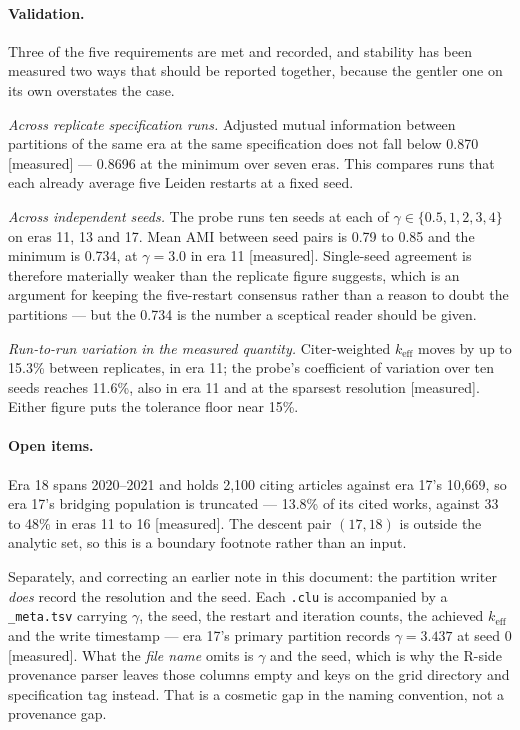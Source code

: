 \documentclass[11pt]{article}
\newcommand{\meas}{{\footnotesize\textsf{[measured]}}}
\newcommand{\code}[1]{\texttt{\small #1}}
\begin{document}
\paragraph{Validation.} Three of the five requirements are met and recorded, and stability has
been measured two ways that should be reported together, because the gentler one on its own
overstates the case.

\emph{Across replicate specification runs.} Adjusted mutual information between partitions of
the same era at the same specification does not fall below 0.870 \meas{} --- 0.8696 at the
minimum over seven eras. This compares runs that each already average five Leiden restarts at
a fixed seed.

\emph{Across independent seeds.} The probe runs ten seeds at each of
$\gamma \in \{0.5, 1, 2, 3, 4\}$ on eras 11, 13 and 17. Mean AMI between seed pairs is 0.79
to 0.85 and the minimum is 0.734, at $\gamma = 3.0$ in era 11 \meas{}. Single-seed agreement
is therefore materially weaker than the replicate figure suggests, which is an argument for
keeping the five-restart consensus rather than a reason to doubt the partitions --- but the
0.734 is the number a sceptical reader should be given.

\emph{Run-to-run variation in the measured quantity.} Citer-weighted $k_{\mathrm{eff}}$ moves
by up to 15.3\% between replicates, in era 11; the probe's coefficient of variation over ten
seeds reaches 11.6\%, also in era 11 and at the sparsest resolution \meas{}. Either figure
puts the tolerance floor near 15\%.

\paragraph{Open items.} Era 18 spans 2020--2021 and holds 2{,}100 citing articles against era
17's 10{,}669, so era 17's bridging population is truncated --- 13.8\% of its cited works,
against 33 to 48\% in eras 11 to 16 \meas{}. The descent pair $(17,18)$ is outside the
analytic set, so this is a boundary footnote rather than an input.

Separately, and correcting an earlier note in this document: the partition writer \emph{does}
record the resolution and the seed. Each \code{.clu} is accompanied by a
\code{\_meta.tsv} carrying $\gamma$, the seed, the restart and iteration counts, the
achieved $k_{\mathrm{eff}}$ and the write timestamp --- era 17's primary partition records
$\gamma = 3.437$ at seed 0 \meas{}. What the \emph{file name} omits is $\gamma$ and the seed,
which is why the R-side provenance parser leaves those columns empty and keys on the grid
directory and specification tag instead. That is a cosmetic gap in the naming convention, not
a provenance gap.
\end{document}
